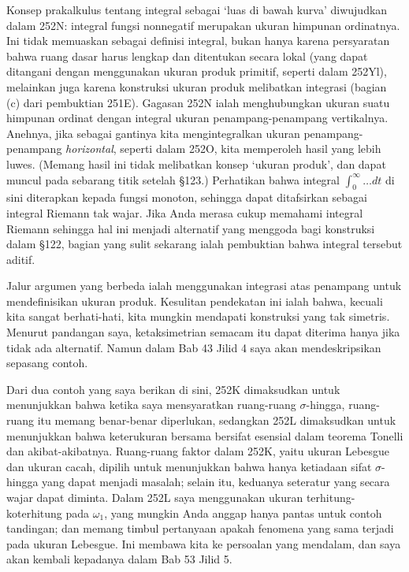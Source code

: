 {Konsep prakalkulus tentang integral sebagai `luas di bawah kurva' diwujudkan
dalam 252N: integral fungsi nonnegatif merupakan ukuran himpunan ordinatnya.
Ini tidak memuaskan sebagai definisi integral, bukan hanya karena persyaratan
bahwa ruang dasar harus lengkap dan ditentukan secara lokal (yang dapat
ditangani dengan menggunakan ukuran produk primitif, seperti dalam 252Yl),
melainkan juga karena konstruksi ukuran produk melibatkan integrasi (bagian
(c) dari pembuktian 251E).
Gagasan 252N ialah menghubungkan ukuran suatu himpunan ordinat dengan integral
ukuran penampang-penampang vertikalnya. Anehnya, jika sebagai gantinya kita
mengintegralkan ukuran penampang-penampang {\it horizontal}, seperti dalam
252O, kita memperoleh hasil yang lebih luwes. (Memang hasil ini tidak
melibatkan konsep `ukuran produk', dan dapat muncul pada sebarang titik setelah
\S123.) Perhatikan bahwa integral $\int_0^{\infty}\ldots dt$ di sini
diterapkan kepada fungsi monoton, sehingga dapat ditafsirkan sebagai integral
Riemann tak wajar. Jika Anda merasa cukup memahami integral Riemann sehingga
hal ini menjadi alternatif yang menggoda bagi konstruksi dalam \S122, bagian
yang sulit sekarang ialah pembuktian bahwa integral tersebut aditif.

Jalur argumen yang berbeda ialah menggunakan integrasi atas penampang untuk
mendefinisikan ukuran produk. Kesulitan pendekatan ini ialah bahwa, kecuali
kita sangat berhati-hati, kita mungkin mendapati konstruksi yang tak simetris.
Menurut pandangan saya, ketaksimetrian semacam itu dapat diterima hanya jika
tidak ada alternatif. Namun dalam Bab 43 Jilid 4 saya akan mendeskripsikan
sepasang contoh.

Dari dua contoh yang saya berikan di sini, 252K dimaksudkan untuk menunjukkan
bahwa ketika saya mensyaratkan ruang-ruang $\sigma$-hingga, ruang-ruang itu
memang benar-benar diperlukan, sedangkan 252L dimaksudkan untuk menunjukkan
bahwa keterukuran bersama bersifat esensial dalam teorema Tonelli dan
akibat-akibatnya. Ruang-ruang faktor dalam 252K, yaitu ukuran Lebesgue dan
ukuran cacah, dipilih untuk menunjukkan bahwa hanya ketiadaan sifat
$\sigma$-hingga yang dapat menjadi masalah; selain itu, keduanya seteratur
yang secara wajar dapat diminta. Dalam 252L saya menggunakan ukuran
terhitung-koterhitung pada $\omega_1$, yang mungkin Anda anggap hanya pantas
untuk contoh tandingan; dan memang timbul pertanyaan apakah fenomena yang sama
terjadi pada ukuran Lebesgue. Ini membawa kita ke persoalan yang mendalam, dan
saya akan kembali kepadanya dalam Bab 53 Jilid 5.

}
